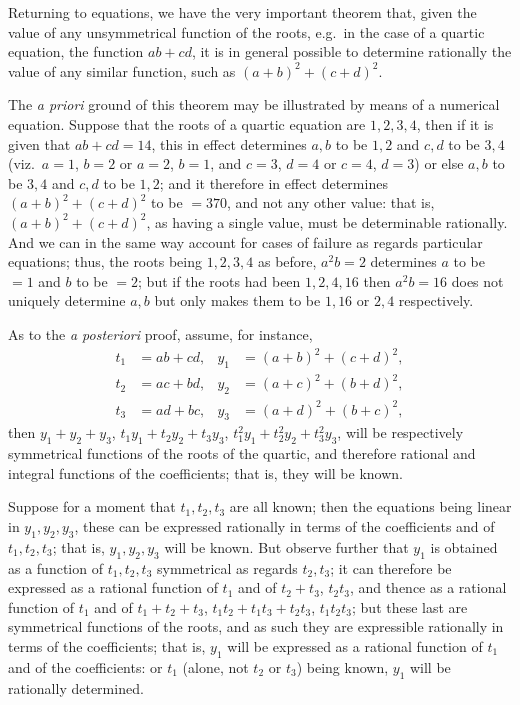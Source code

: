 \documentclass[11pt,a4paper]{book}
\begin{document}
Returning to equations, we have the very important theorem that, given the value of any unsymmetrical function of the roots, e.g.\ in the case of a quartic equation, the function $ab + cd$, it is in general possible to determine rationally the value of any similar function, such as $(a + b)^{2} + (c + d)^{2}$.

The \textit{a priori} ground of this theorem may be illustrated by means of a numerical equation. Suppose that the roots of a quartic equation are $1, 2, 3, 4$, then if it is given that $ab + cd = 14$, this in effect determines $a, b$ to be $1, 2$ and $c, d$ to be $3, 4$ (viz.\ $a = 1$, $b = 2$ or $a = 2$, $b = 1$, and $c = 3$, $d = 4$ or $c = 4$, $d = 3$) or else $a, b$ to be $3, 4$ and $c, d$ to be $1, 2$; and it therefore in effect determines $(a + b)^{2} + (c + d)^{2}$ to be $= 370$, and not any other value: that is, $(a + b)^{2} + (c + d)^{2}$, as having a single value, must be determinable rationally. And we can in the same way account for cases of failure as regards particular equations; thus, the roots being $1, 2, 3, 4$ as before, $a^{2}b = 2$ determines $a$ to be $= 1$ and $b$ to be $= 2$; but if the roots had been $1, 2, 4, 16$ then $a^{2}b = 16$ does not uniquely determine $a, b$ but only makes them to be $1, 16$ or $2, 4$ respectively.

As to the \textit{a posteriori} proof, assume, for instance,
\begin{align*}
t_{1} &= ab + cd, & y_{1} &= (a + b)^{2} + (c + d)^{2}, \\
t_{2} &= ac + bd, & y_{2} &= (a + c)^{2} + (b + d)^{2}, \\
t_{3} &= ad + bc, & y_{3} &= (a + d)^{2} + (b + c)^{2},
\end{align*}
then $y_{1} + y_{2} + y_{3}$, $t_{1}y_{1} + t_{2}y_{2} + t_{3}y_{3}$, $t_{1}^{2}y_{1} + t_{2}^{2}y_{2} + t_{3}^{2}y_{3}$, will be respectively symmetrical functions of the roots of the quartic, and therefore rational and integral functions of the coefficients; that is, they will be known.

Suppose for a moment that $t_{1}, t_{2}, t_{3}$ are all known; then the equations being linear in $y_{1}, y_{2}, y_{3}$, these can be expressed rationally in terms of the coefficients and of $t_{1}, t_{2}, t_{3}$; that is, $y_{1}, y_{2}, y_{3}$ will be known. But observe further that $y_{1}$ is obtained as a function of $t_{1}, t_{2}, t_{3}$ symmetrical as regards $t_{2}, t_{3}$; it can therefore be expressed as a rational function of $t_{1}$ and of $t_{2} + t_{3}$, $t_{2}t_{3}$, and thence as a rational function of $t_{1}$ and of $t_{1} + t_{2} + t_{3}$, $t_{1}t_{2} + t_{1}t_{3} + t_{2}t_{3}$, $t_{1}t_{2}t_{3}$; but these last are symmetrical functions of the roots, and as such they are expressible rationally in terms of the coefficients; that is, $y_{1}$ will be expressed as a rational function of $t_{1}$ and of the coefficients: or $t_{1}$ (alone, not $t_{2}$ or $t_{3}$) being known, $y_{1}$ will be rationally determined.
\end{document}

